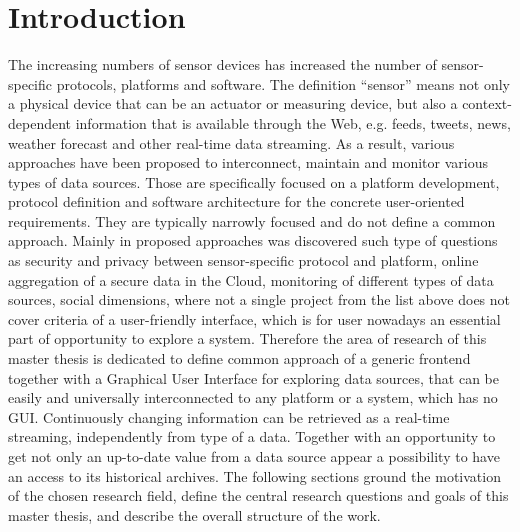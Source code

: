 
\chapter{Introduction}

  \begin{singlespace}
     The increasing numbers of sensor devices has increased the number of sensor-specific protocols, platforms and software. The definition ``sensor'' means not only a physical device that can be an actuator or measuring device, but also a context-dependent information that is available through the Web, e.g. feeds, tweets, news, weather forecast and other real-time data streaming. As a result, various approaches have been proposed to interconnect, maintain and monitor various types of data sources\cite{6588063,bendel2013service,song2010real}. Those are specifically focused on a platform development, protocol definition and software architecture for the concrete user-oriented requirements. They are typically narrowly focused and do not define a common approach. Mainly in proposed approaches was discovered such type of questions as security and privacy between sensor-specific protocol and platform, online aggregation of a secure data in the Cloud, monitoring of different types of data sources, social dimensions\cite{eggert2013sensorcloud}, where not a single project from the list above does not cover criteria of a user-friendly interface, which is for user nowadays an essential part of opportunity to explore a system. Therefore the area of research of this master thesis is dedicated to define common approach of a generic frontend together with a Graphical User Interface for exploring data sources, that can be easily and universally interconnected to any platform or a system, which has no GUI. Continuously changing information can be retrieved as a real-time streaming, independently from type of a data. Together with an opportunity to get not only an up-to-date value from a data source appear a possibility to have an access to its historical archives. The following sections ground the motivation of the chosen research field, define the central research questions and goals of this master thesis, and describe the overall structure of the work.
  \end{singlespace}

